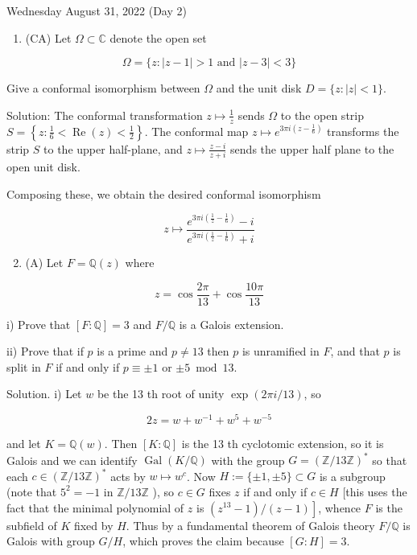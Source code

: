 \documentclass[10pt]{article}
\begin{document}
Wednesday August 31, 2022 (Day 2)

\begin{enumerate}
  \item (CA) Let $\Omega \subset \mathbb{C}$ denote the open set
\end{enumerate}

$$
\Omega=\{z:|z-1|>1 \text { and }|z-3|<3\}
$$

Give a conformal isomorphism between $\Omega$ and the unit disk $D=\{z:|z|<1\}$.

Solution: The conformal transformation $z \mapsto \frac{1}{z}$ sends $\Omega$ to the open strip $S=\left\{z: \frac{1}{6}<\operatorname{Re}(z)<\frac{1}{2}\right\}$. The conformal map $z \mapsto e^{3 \pi i\left(z-\frac{1}{6}\right)}$ transforms the strip $S$ to the upper half-plane, and $z \mapsto \frac{z-i}{z+i}$ sends the upper half plane to the open unit disk.

Composing these, we obtain the desired conformal isomorphism

$$
z \mapsto \frac{e^{3 \pi i\left(\frac{1}{z}-\frac{1}{6}\right)}-i}{e^{3 \pi i\left(\frac{1}{z}-\frac{1}{6}\right)}+i}
$$

\begin{enumerate}
  \setcounter{enumi}{1}
  \item (A) Let $F=\mathbb{Q}(z)$ where
\end{enumerate}

$$
z=\cos \frac{2 \pi}{13}+\cos \frac{10 \pi}{13}
$$

i) Prove that $[F: \mathbb{Q}]=3$ and $F / \mathbb{Q}$ is a Galois extension.

ii) Prove that if $p$ is a prime and $p \neq 13$ then $p$ is unramified in $F$, and that $p$ is split in $F$ if and only if $p \equiv \pm 1$ or $\pm 5 \bmod 13$.

Solution. i) Let $w$ be the 13 th root of unity $\exp (2 \pi i / 13)$, so

$$
2 z=w+w^{-1}+w^{5}+w^{-5}
$$

and let $K=\mathbb{Q}(w)$. Then $[K: \mathbb{Q}]$ is the 13 th cyclotomic extension, so it is Galois and we can identify $\operatorname{Gal}(K / \mathbb{Q})$ with the group $G=(\mathbb{Z} / 13 \mathbb{Z})^{*}$ so that each $c \in(\mathbb{Z} / 13 \mathbb{Z})^{*}$ acts by $w \mapsto w^{c}$. Now $H:=\{ \pm 1, \pm 5\} \subset G$ is a subgroup (note that $5^{2}=-1$ in $\mathbb{Z} / 13 \mathbb{Z}$ ), so $c \in G$ fixes $z$ if and only if $c \in H$ [this uses the fact that the minimal polynomial of $z$ is $\left.\left(z^{13}-1\right) /(z-1)\right]$, whence $F$ is the subfield of $K$ fixed by $H$. Thus by a fundamental theorem of Galois theory $F / \mathbb{Q}$ is Galois with group $G / H$, which proves the claim because $[G: H]=3$.
\end{document}
